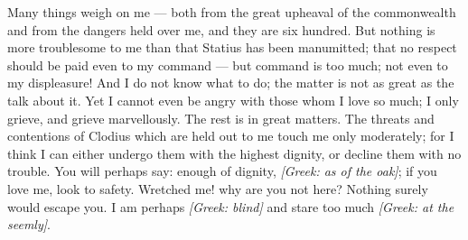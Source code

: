 

 Many things weigh on me --- both from the great upheaval of the commonwealth and from the dangers held over me, and they are six hundred. But nothing is more troublesome to me than that Statius has been manumitted; that no respect should be paid even to my command --- but command is too much; not even to my displeasure! And I do not know what to do; the matter is not as great as the talk about it. Yet I cannot even be angry with those whom I love so much; I only grieve, and grieve marvellously. \textsection The rest is in great matters. \textsection The threats and contentions of Clodius which are held out to me touch me only moderately; for I think I can either undergo them with the highest dignity, or decline them with no trouble. You will perhaps say: enough of dignity, \textit{[Greek: as of the oak]}; if you love me, look to safety. Wretched me! why are you not here? Nothing surely would escape you. I am perhaps \textit{[Greek: blind]} and stare too much \textit{[Greek: at the seemly]}.

